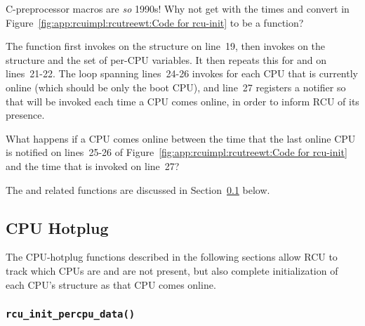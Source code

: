 \QuickQuiz{}
	C-preprocessor macros are \emph{so} 1990s!
	Why not get with the times and convert 
	in Figure~\ref{fig:app:rcuimpl:rcutreewt:Code for rcu-init}
	to be a function?
 \QuickQuizEnd

The  function first invokes 
on the  structure on line~19, then invokes
 on the  structure and
the  set of per-CPU variables.
It then repeats this for  and 
on lines~21-22.
The loop spanning lines~24-26 invokes  for
each CPU that is currently online (which should be only the boot
CPU), and line~27 registers a notifier so that 
will be invoked each time a CPU comes online, in order to inform
RCU of its presence.

\QuickQuiz{}
	What happens if a CPU comes online between the time
	that the last online CPU is notified on lines~25-26 of
	Figure~\ref{fig:app:rcuimpl:rcutreewt:Code for rcu-init}
	and the time that  is invoked
	on line~27?
 \QuickQuizEnd

The  and related functions are discussed in
Section~\ref{app:rcuimpl:rcutreewt:CPU Hotplug}
below.

\subsection{CPU Hotplug}
\label{app:rcuimpl:rcutreewt:CPU Hotplug}

The CPU-hotplug functions described in the following sections
allow RCU to track which CPUs are and are not present, but also
complete initialization of each CPU's  structure
as that CPU comes online.

\subsubsection{\tt rcu\_init\_percpu\_data()}
\label{app:rcuimpl:rcutreewt:rcu-init-percpu-data}

